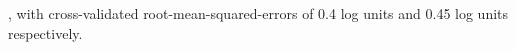 %
%

, with cross-validated root-mean-squared-errors of 0.4 log units and 0.45 log units respectively.

